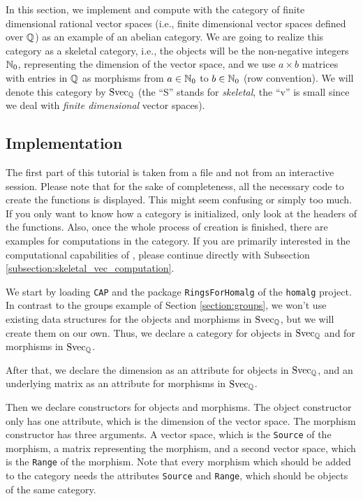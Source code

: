 In this section, we implement and compute with the category of finite dimensional rational vector spaces
(i.e., finite dimensional vector spaces defined over $\mathbb{Q}$) as an
example of an abelian category. We are going
to realize this category as a skeletal category, i.e., the objects will be the non-negative integers $\mathbb{N}_0$,
representing the dimension of the vector space, and we use $a \times b$ matrices with entries in $\mathbb{Q}$ as morphisms
from $a \in \mathbb{N}_0$ to $b \in \mathbb{N}_0$ (row convention). We will denote this category by $\mathrm{Svec}_{\mathbb{Q}}$
(the ``S'' stands for \emph{skeletal}, the ``v'' is small since we deal with \emph{finite dimensional} vector spaces).

\subsection{Implementation}

The first part of this tutorial is taken from a file and not from
an interactive session. Please note that for the sake of completeness, all the necessary code to create the
functions is displayed. This might seem confusing or simply too much. If you only want to know how a \CapPkg category
is initialized, only look at the headers of the functions. Also, once the whole process of creation is finished,
there are examples for computations in the category. If you are primarily interested in the computational capabilities of \CapPkg, please
continue directly with Subsection \ref{subsection:skeletal_vec_computation}.



We start by loading \texttt{CAP} and the package \texttt{RingsForHomalg} of the \texttt{homalg} project.
In contrast to the groups example of Section \ref{section:groups}, we won't use existing data structures for the objects and morphisms
in $\mathrm{Svec}_{\mathbb{Q}}$, but we will create them on our own. Thus, we declare
a \GAP category for objects in $\mathrm{Svec}_{\mathbb{Q}}$ and for morphisms in $\mathrm{Svec}_{\mathbb{Q}}$.

After that, we declare the dimension as an attribute for objects in $\mathrm{Svec}_{\mathbb{Q}}$,
and an underlying matrix as an attribute for morphisms in $\mathrm{Svec}_{\mathbb{Q}}$.

Then we declare constructors
for objects and morphisms. The object constructor only has one attribute, which is the dimension of the vector space.
The morphism constructor has three arguments. A vector space, which is the \texttt{Source} of the morphism, a matrix
representing the morphism, and a second vector space, which is the \texttt{Range} of the morphism. Note that every morphism
which should be added to the category needs the \GAP attributes \texttt{Source} and \texttt{Range}, which should be
objects of the same category.

